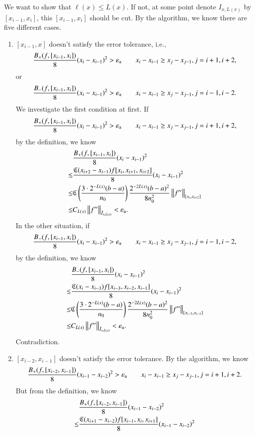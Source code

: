 We want to show that $\ell(x) \le L(x)$. If not, at some point denote $I_{x,L(x)}$ by $[x_{i-1},x_i]$, this $[x_{i-1},x_i]$ should be cut.
By the algorithm, we know there are five different cases. 
\begin{enumerate}
  \item $[x_{i-1},x]$ doesn't satisfy the error tolerance, i.e.,
  $$\frac{B_+(f,[x_{i-1},x_i])}{8}(x_i-x_{i-1})^2 > \abstol \qquad x_{i}-x_{i-1} \ge x_{j}-x_{j-1}, j=i+1,i+2,$$
  or
  $$\frac{B_-(f,[x_{i-1},x_i])}{8}(x_i-x_{i-1})^2 > \abstol \qquad x_{i}-x_{i-1} \ge x_{j}-x_{j-1}, j=i-1,i-2.$$
  We investigate the first condition at first.
  If 
  $$\frac{B_+(f,[x_{i-1},x_i])}{8}(x_i-x_{i-1})^2 > \abstol \qquad x_{i}-x_{i-1} \ge x_{j}-x_{j-1}, j=i+1,i+2,$$
  by the definition, we know
  \begin{align*}
  & \frac{B_+(f,[x_{i-1},x_i])}{8}(x_i-x_{i-1})^2 \\ \le &\frac{\fC(x_{i+2}-x_{i-1})f[x_{i},x_{i+1},x_{i+2}]}{8}(x_{i}-x_{i-1})^2\\
    \le & \fC\left(\frac{3\cdot2^{-L(x)}(b-a)}{n_0}\right) \frac{2^{-2L(x)}(b-a)^2}{8n^2_0}\norm[{[x_{i},x_{i+2}]}]{f''} \\
     \le & C_{L(x)} \norm[\bar{I}_{x,L(x)}]{f''} < \abstol.
  \end{align*}
  In the other situation, if $$\frac{B_-(f,[x_{i-1},x_i])}{8}(x_i-x_{i-1})^2 > \abstol \qquad x_{i}-x_{i-1} \ge x_{j}-x_{j-1}, j=i-1,i-2,$$
  by the definition, we know
  \begin{align*}
  & \frac{B_-(f,[x_{i-1},x_i])}{8}(x_i-x_{i-1})^2 \\ \le &\frac{\fC(x_{i}-x_{i-3})f[x_{i-3},x_{i-2},x_{i-1}]}{8}(x_{i}-x_{i-1})^2\\
    \le & \fC\left(\frac{3\cdot2^{-L(x)}(b-a)}{n_0}\right) \frac{2^{-2L(x)}(b-a)^2}{8n^2_0}\norm[{[x_{i-3},x_{i-1}]}]{f''} \\
     \le & C_{L(x)} \norm[\bar{I}_{x,L(x)}]{f''} < \abstol.
  \end{align*}
  Contradiction.  
  \item $[x_{i-2},x_{i-1}]$ doesn't satisfy the error tolerance.  By the algorithm, we know
  \[
  \frac{B_+(f,[x_{i-2},x_{i-1}])}{8}(x_{i-1}-x_{i-2})^2 > \abstol \qquad x_{i}-x_{i-1} \ge x_{j}-x_{j-1}, j=i+1,i+2.
  \]
  But from the definition, we know
  \begin{align*}
  & \frac{B_+(f,[x_{i-2},x_{i-1}])}{8}(x_{i-1}-x_{i-2})^2 \\ \le &\frac{\fC(x_{i+1}-x_{i-2})f[x_{i-1},x_{i},x_{i+1}]}{8}(x_{i-1}-x_{i-2})^2\\

\end{align*}
\end{enumerate}
